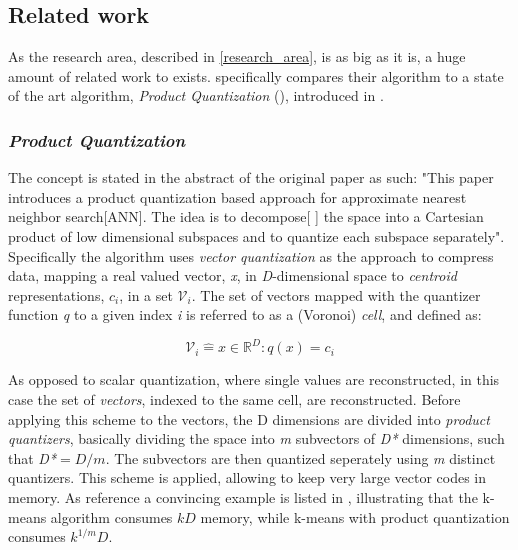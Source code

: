 \subsection{Related work}
\label{state_of_the_art}
As the research area, described in \ref{research_area}, is as big as it is, a huge amount of related work to \qs{} exists. \cite{wagner17} specifically compares their algorithm to a state of the art algorithm, \textit{Product Quantization} (\pq{}), introduced in \cite{schmid9}. %

\subsubsection{\textit{Product Quantization}}
The \pq{} concept is stated in the abstract of the original paper as such: "This paper introduces a product quantization based approach for approximate nearest neighbor search[ANN]. The idea is to decompose[ ] the space into a Cartesian product of low dimensional subspaces and to quantize each subspace separately". Specifically the algorithm uses \textit{vector quantization} as the approach to compress data, mapping a real valued vector, \textit{x}, in \textit{D}-dimensional space to \textit{centroid} representations, \textit{$c_i$}, in a set $\mathcal{V}_i$\cite[p.3 II-A]{schmid9}. The set of vectors mapped with the quantizer function \textit{q} to a given index \textit{i} is referred to as a (Voronoi) \textit{cell}, and defined as:

\begin{equation}
	\mathcal{V}_i\mathrel{\hat=}{x\in\mathbb{R}^D : q(x)=c_i}
\end{equation}

As opposed to scalar quantization, where single values are reconstructed, in this case the set of \textit{vectors}, indexed to the same cell, are reconstructed. Before applying this scheme to the vectors, the D dimensions are divided into \textit{product quantizers}, basically dividing the space into \textit{m} subvectors of \textit{D*} dimensions, such that \textit{D*$=D/m$}\cite[p.3 II-B]{schmid9}. The subvectors are then quantized seperately using \textit{m} distinct quantizers. This scheme is applied, allowing to keep very large vector codes in memory. As reference a convincing example is listed in \cite[Table I, p. 4]{schmid9}, illustrating that the k-means algorithm consumes $kD$ memory, while k-means with product quantization consumes  $k^{1/m}D$.

